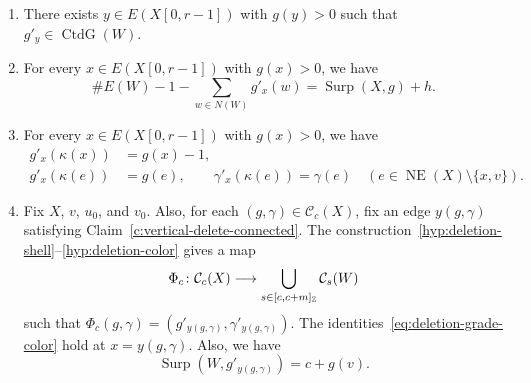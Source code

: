 \begin{lemma}[Deletion]
\begin{enumerate}
\item\label{c:vertical-delete-connected}\label{c:vertical-delete-connectivity}
There exists $y\in E(X[0,r-1])$ with $g(y)>0$ such that
$g'_y\in\operatorname{CtdG}(W)$.
\item\label{c:vertical-delete-residual} For every $x\in E(X[0,r-1])$ with $g(x)>0$, we have
\[
 \#E(W)-1-\sum_{w\in N(W)}g'_x(w)=\operatorname{Surp}(X,g)+h.
\]
\item\label{c:vertical-delete-preserved} For every $x\in E(X[0,r-1])$ with $g(x)>0$, we have
\begin{equation}\label{eq:deletion-grade-color}
\begin{aligned}
 g'_x(\kappa(x))&=g(x)-1,\\
 g'_x(\kappa(e))&=g(e),\qquad \gamma'_x(\kappa(e))=\gamma(e)
 \quad(e\in\operatorname{NE}(X)\setminus\{x,v\}).
\end{aligned}
\end{equation}
\item\label{c:vertical-delete-map} Fix $X$, $v$, $u_0$, and $v_0$.
Also, for each $(g,\gamma)\in\mathcal C_c(X)$, fix an edge $y(g,\gamma)$ satisfying Claim~\ref{c:vertical-delete-connected}.
The construction~\ref{hyp:deletion-shell}--\ref{hyp:deletion-color} gives a map
\[
 \Phi_c\colon\mathcal C_c(X)\longrightarrow
 \bigcup_{s\in[c,c+m]_{\mathbb Z}}\mathcal C_s(W)
\]
such that $\Phi_c(g,\gamma)=(g'_{y(g,\gamma)},\gamma'_{y(g,\gamma)})$.
The identities~\eqref{eq:deletion-grade-color} hold at $x=y(g,\gamma)$.
Also, we have
\[
 \operatorname{Surp}(W,g'_{y(g,\gamma)})=c+g(v).
\]
\end{enumerate}
\end{lemma}
